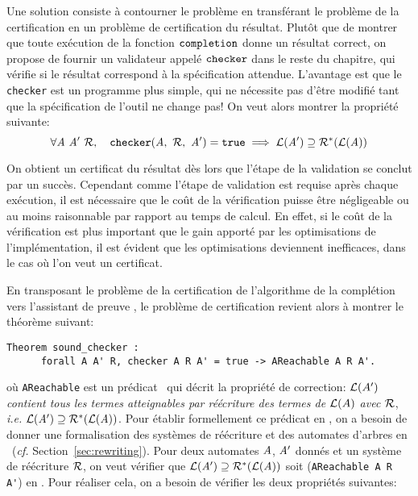 Une solution consiste à contourner le problème en transférant le problème de la certification en un problème
de certification du résultat. Plutôt que de montrer que toute exécution de la fonction $\mathtt{completion}$ donne un résultat
correct, on propose de fournir un validateur appelé $\mathtt{checker}$ dans le reste du chapitre, qui vérifie si le résultat correspond
à la spécification attendue. L'avantage est que le \lstinline!checker! est un programme plus simple, qui ne nécessite pas d'être modifié
tant que la spécification de l'outil ne change pas! On veut alors montrer la propriété suivante:
\[\forall \A\ \A'\ \R,\quad \kw{checker}(\A,\ \R,\ \A') = \kw{true} \imp \Lang(\A') \supseteq \R^*(\Lang(\A))\]

On obtient un certificat du résultat dès lors que l'étape de la validation se conclut par un succès.
Cependant comme l'étape de validation est requise après chaque exécution, il est nécessaire que le coût 
de la vérification puisse être négligeable ou au moins raisonnable par rapport au temps de calcul.
En effet, si le coût de la vérification est plus important que le gain apporté par les optimisations 
de l'implémentation, il est évident que les optimisations deviennent inefficaces, dans le cas
où l'on veut un certificat.


En transposant le problème de la certification de l'algorithme de la complétion vers 
l'assistant de preuve \coq, le problème de certification revient alors à montrer le théorème suivant:

\begin{lstlisting}
Theorem sound_checker :
      forall A A' R, checker A R A' = true -> AReachable A R A'.
\end{lstlisting}
où \lstinline!AReachable! est un prédicat \coq\  qui décrit
la propriété de correction: \emph{$\mathcal{L}(A')$ contient tous les termes atteignables
  par réécriture des termes de $\mathcal{L}(A)$ avec $\mathcal R$}, \textit{i.e.} $\mathcal{L}(\mathit A')
\supseteq \mathcal R^*(\mathcal{L}(\mathit A))$. 
Pour établir formellement ce prédicat en \coq, on a besoin de donner une formalisation
des systèmes de réécriture et des automates d'arbres en \coq\ (\textit{cf.} Section~\ref{sec:rewriting}).
Pour deux automates $\mathit A$, $\mathit A'$ donnés et un système de réécriture $\mathcal R$, on veut vérifier 
que $\mathcal{L}(\mathit A')\supseteq \mathcal R^*(\mathcal{L}(\mathit A))$ soit (\lstinline!AReachable A R A'!) en \coq.
Pour réaliser cela, on a besoin de vérifier les deux propriétés suivantes:

